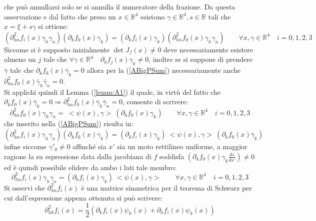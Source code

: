 che può annullarsi solo se si annulla il numeratore della frazione. Da questa osservazione e dal fatto che preso un $x\in \mathbb{R}^4 $ esistono $ \gamma \in\mathbb{R}^4, s \in \mathbb{R}$ tali che $x=\xi+s\gamma$ si ottiene:
\begin{equation}
    \left(\partial^2_{hn}f_i(x)\gamma_h\gamma_n\right)\left(\partial_kf_0(x)\gamma_k\right)
    = \left(\partial_kf_i(x)\gamma_k\right)\left(\partial^2_{hn}f_0(x)\gamma_h\gamma_n\right) \qquad \forall x,\gamma\in \mathbb{R}^4 \quad i=0,1,2,3  
    \label{ABigPSum}
\end{equation}
Siccome si è supposto inizialmente $\det J_f(x)\neq 0$ deve necessariamente esistere almeno un $j$ tale che $ \forall\gamma\in \mathbb{R}^4\quad\partial_kf_j(x)\gamma_k\neq 0$, inoltre se si suppone di prendere $\bar{\gamma}$ tale che $\partial_kf_0(x)\bar{\gamma}_k=0$ allora per la (\ref{ABigPSum}) necessariamente anche $\partial^2_{hn}f_0(x)\bar{\gamma}_h\bar{\gamma}_n=0$.\\

Si applichi quindi il Lemma (\ref{lemm:A1}) il quale, in virtù del fatto che $\partial_kf_0(x)\bar{\gamma}_k=0\Rightarrow \partial^2_{hn}f_0(x)\bar{\gamma}_h\bar{\gamma}_n=0$, consente di scrivere:
\begin{equation*}
    \partial^2_{hn}f_0(x)\gamma_h\gamma_n=\ <\psi(x),\gamma>\ (\partial_kf_0(x)\gamma_k) \qquad   \forall x,\gamma\in \mathbb{R}^4 \quad i=0,1,2,3  
\end{equation*}
che inserito nella (\ref{ABigPSum}) risulta in:
\begin{equation*}
    \left(\partial^2_{hn}f_i(x)\gamma_h\gamma_n\right)\left(\partial_kf_0(x)\gamma_k\right)
    = \left(\partial_kf_i(x)\gamma_k\right)\ <\psi(x),\gamma>\ (\partial_kf_0(x)\bar{\gamma}_k)
\end{equation*}
infine siccome $\gamma'_0\neq 0$ affinché sia $x'$ sia un moto rettilineo uniforme, a maggior ragione la su espressione data dalla jacobiana di $f$ soddisfa $(\partial_kf_0(x)\gamma_k\frac{ds}{ds'})\neq 0$ ed è quindi possibile elidere da ambo i lati tale membro:
\begin{equation}
    \partial^2_{hn}f_i(x)\gamma_h\gamma_n=\left(\partial_kf_i(x)\gamma_k\right)\ <\psi(x),\gamma> \qquad   \forall x,\gamma\in \mathbb{R}^4 \quad i=0,1,2,3
    \label{APArtialScal}
\end{equation}
Si osservi che  $\partial^2_{hn}f_i(x)$ è una matrice simmetrica per il teorema di Schwarz per cui dall'espressione appena ottenuta si può scrivere:
\begin{equation}
    \partial^2_{hk}f_i(x)=\frac{1}{2}\left(\partial_kf_i(x)\psi_h(x)+\partial_hf_i(x)\psi_k(x)\right)
    \label{APArtialScalSimm}
\end{equation}

